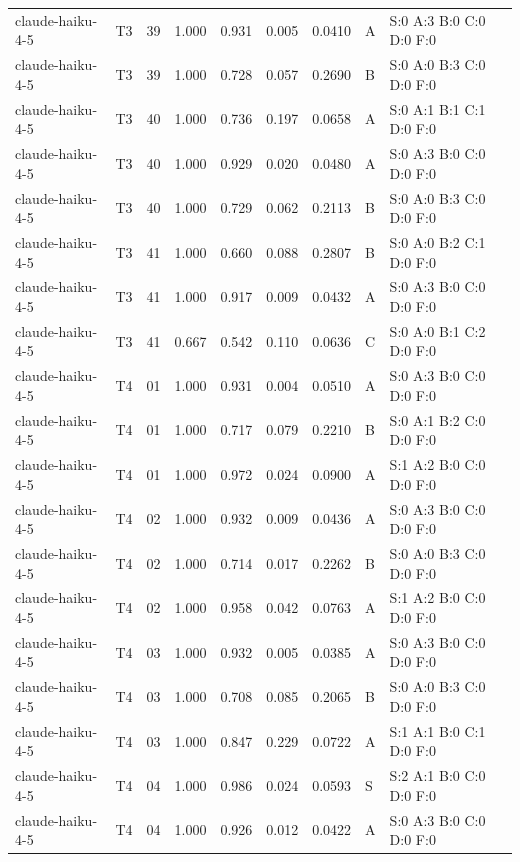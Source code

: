 \begin{longtable}{llrrrrrll}
claude-haiku-4-5 & T3 & 39 & 1.000 & 0.931 & 0.005 & 0.0410 & A & \tiny S:0 A:3 B:0 C:0 D:0 F:0 \\
claude-haiku-4-5 & T3 & 39 & 1.000 & 0.728 & 0.057 & 0.2690 & B & \tiny S:0 A:0 B:3 C:0 D:0 F:0 \\
claude-haiku-4-5 & T3 & 40 & 1.000 & 0.736 & 0.197 & 0.0658 & A & \tiny S:0 A:1 B:1 C:1 D:0 F:0 \\
claude-haiku-4-5 & T3 & 40 & 1.000 & 0.929 & 0.020 & 0.0480 & A & \tiny S:0 A:3 B:0 C:0 D:0 F:0 \\
claude-haiku-4-5 & T3 & 40 & 1.000 & 0.729 & 0.062 & 0.2113 & B & \tiny S:0 A:0 B:3 C:0 D:0 F:0 \\
claude-haiku-4-5 & T3 & 41 & 1.000 & 0.660 & 0.088 & 0.2807 & B & \tiny S:0 A:0 B:2 C:1 D:0 F:0 \\
claude-haiku-4-5 & T3 & 41 & 1.000 & 0.917 & 0.009 & 0.0432 & A & \tiny S:0 A:3 B:0 C:0 D:0 F:0 \\
claude-haiku-4-5 & T3 & 41 & 0.667 & 0.542 & 0.110 & 0.0636 & C & \tiny S:0 A:0 B:1 C:2 D:0 F:0 \\
claude-haiku-4-5 & T4 & 01 & 1.000 & 0.931 & 0.004 & 0.0510 & A & \tiny S:0 A:3 B:0 C:0 D:0 F:0 \\
claude-haiku-4-5 & T4 & 01 & 1.000 & 0.717 & 0.079 & 0.2210 & B & \tiny S:0 A:1 B:2 C:0 D:0 F:0 \\
claude-haiku-4-5 & T4 & 01 & 1.000 & 0.972 & 0.024 & 0.0900 & A & \tiny S:1 A:2 B:0 C:0 D:0 F:0 \\
claude-haiku-4-5 & T4 & 02 & 1.000 & 0.932 & 0.009 & 0.0436 & A & \tiny S:0 A:3 B:0 C:0 D:0 F:0 \\
claude-haiku-4-5 & T4 & 02 & 1.000 & 0.714 & 0.017 & 0.2262 & B & \tiny S:0 A:0 B:3 C:0 D:0 F:0 \\
claude-haiku-4-5 & T4 & 02 & 1.000 & 0.958 & 0.042 & 0.0763 & A & \tiny S:1 A:2 B:0 C:0 D:0 F:0 \\
claude-haiku-4-5 & T4 & 03 & 1.000 & 0.932 & 0.005 & 0.0385 & A & \tiny S:0 A:3 B:0 C:0 D:0 F:0 \\
claude-haiku-4-5 & T4 & 03 & 1.000 & 0.708 & 0.085 & 0.2065 & B & \tiny S:0 A:0 B:3 C:0 D:0 F:0 \\
claude-haiku-4-5 & T4 & 03 & 1.000 & 0.847 & 0.229 & 0.0722 & A & \tiny S:1 A:1 B:0 C:1 D:0 F:0 \\
claude-haiku-4-5 & T4 & 04 & 1.000 & 0.986 & 0.024 & 0.0593 & S & \tiny S:2 A:1 B:0 C:0 D:0 F:0 \\
claude-haiku-4-5 & T4 & 04 & 1.000 & 0.926 & 0.012 & 0.0422 & A & \tiny S:0 A:3 B:0 C:0 D:0 F:0 \\

\end{longtable}
